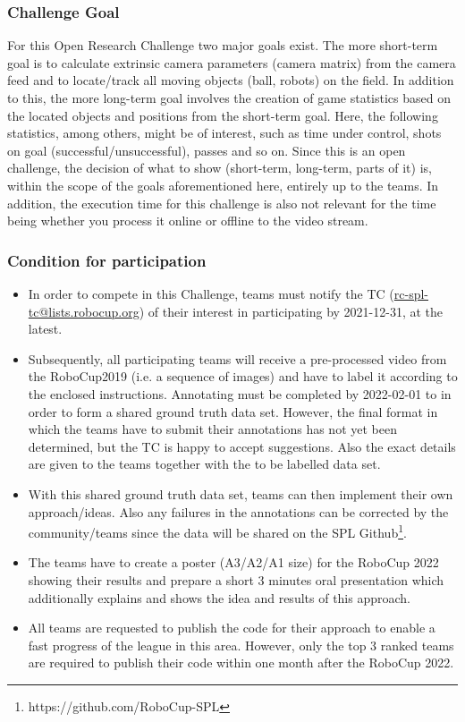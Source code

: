    \subsubsection{Challenge Goal}
    For this Open Research Challenge two major goals exist. The more short-term goal is to calculate extrinsic camera parameters (camera matrix) from the camera feed and to locate/track all moving objects (ball, robots) on the field. In addition to this, the more long-term goal involves the creation of game statistics based on the located objects and positions from the short-term goal. Here, the following statistics, among others, might be of interest, such as time under control, shots on goal (successful/unsuccessful), passes and so on. Since this is an open challenge, the decision of what to show (short-term, long-term, parts of it) is, within the scope of the goals aforementioned here, entirely up to the teams. In addition, the execution time for this challenge is also not relevant for the time being whether you process it online or offline to the video stream.    

    \subsubsection{Condition for participation}
    \begin{itemize}
    \item In order to compete in this Challenge, teams must notify the TC (\url{rc-spl-tc@lists.robocup.org}) of their interest in participating by 2021-12-31, at the latest.
    \item Subsequently, all participating teams will receive a pre-processed video from the RoboCup2019 (i.e. a sequence of images) and have to label it according to the enclosed instructions. Annotating must be completed by 2022-02-01 to in order to form a shared ground truth data set. However, the final format in which the teams have to submit their annotations has not yet been determined, but the TC is happy to accept suggestions. Also the exact details are given to the teams together with the to be labelled data set.
    \item With this shared ground truth data set, teams can then implement their own approach/ideas. Also any failures in the annotations can be corrected by the community/teams since the data will be shared on the SPL Github\footnote{https://github.com/RoboCup-SPL}.
    \item The teams have to create a poster (A3/A2/A1 size) for the RoboCup 2022 showing their results and prepare a short 3 minutes oral presentation which additionally explains and shows the idea and results of this approach.
    \item All teams are requested to publish the code for their approach to enable a fast progress of the league in this area. However, only the top 3 ranked teams are required to publish their code within one month after the RoboCup 2022. 
    \end{itemize}

